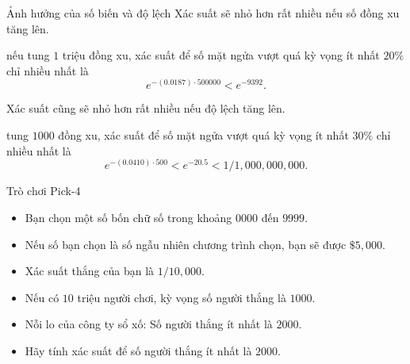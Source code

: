 \begin{frame}{Ảnh hưởng của số biến và độ lệch }
Xác suất sẽ nhỏ hơn rất nhiều nếu số đồng xu tăng lên. 
                  \begin{xmpl}
                    nếu tung $1$ triệu đồng xu, xác suất để số mặt
                    ngửa vượt quá kỳ vọng ít nhất $20\%$ chỉ nhiều
                    nhất là
                    \[
                    e^{-(0.0187)\cdot 500000} < e^{-9392}.
                    \]
                  \end{xmpl}\pause 

	
Xác suất cũng sẽ nhỏ hơn rất nhiều nếu độ lệch tăng lên.
\begin{xmpl}
  tung $1000$ đồng xu, xác suất để số mặt ngửa vượt quá kỳ vọng ít
  nhất $30\%$ chỉ nhiều nhất là
  \[
  e^{-(0.0410)\cdot 500} < e^{-20.5}< 1/1,000,000,000.
  \]
\end{xmpl}

\end{frame}

\begin{frame}{Trò chơi Pick-4}
	\begin{itemize}
		\item<+-> Bạn chọn một số bốn chữ số trong khoảng $0000$ đến $9999$.
		\item<+-> Nếu số bạn chọn là số ngẫu nhiên chương trình chọn, bạn sẽ được $\$5,000$.
		\item<+-> Xác suất thắng của bạn là $1/10,000$.
		\item<+-> Nếu có $10$ triệu người chơi, kỳ vọng số người thắng là $1000$. 
		
		\item<+-> Nỗi lo của công ty sổ xố: Số người thắng ít nhất là $2000$.
		\item<+-> Hãy tính xác suất để số người thắng ít nhất là $2000$.    
	\end{itemize}
\end{frame}

